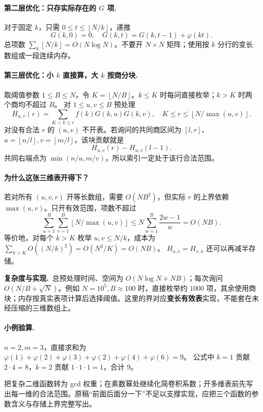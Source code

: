 \documentclass[UTF8,a4paper,11pt,oneside,openany,fontset=fandol]{ctexbook}
\theoremstyle{definition}
\newcommand{\floor}[1]{\left\lfloor #1\right\rfloor}
\newcommand{\cost}{\par\noindent\textbf{复杂度与实现.}\ }
\begin{document}
\paragraph{第二层优化：只存实际存在的 $G$ 项.}
对于固定 $k$，只需 $0\le t\le\floor{N/k}$，递推
\[
 G(k,0)=0,\quad G(k,t)=G(k,t-1)+\varphi(kt).
\]
总项数 $\sum_k\floor{N/k}=O(N\log N)$。不要开 $N\times N$ 矩阵；使用按 $k$ 分行的变长数组或一段连续内存。

\paragraph{第三层优化：小 $k$ 直接算，大 $k$ 按商分块.}
取阈值参数 $1\le B\le N$，令 $K=\floor{N/B}$。$k\le K$ 时每问直接枚举；$k>K$ 时两个商均不超过 $B$。
对 $1\le u,v\le B$ 预处理
\[
 H_{u,v}(r)=\sum_{K<k\le r}f(k)G(k,u)G(k,v),
 \quad K\le r\le\floor{N/\max(u,v)}.
\]
对没有合法 $r$ 的 $(u,v)$ 不开表。若询问的共同商区间为 $[l,r]$、$u=\floor{n/l},v=\floor{m/l}$，该块贡献就是
\[
 H_{u,v}(r)-H_{u,v}(l-1).
\]
共同右端点为 $\min(n/u,m/v)$，所以索引一定处于该行合法范围。

\paragraph{为什么这张三维表开得下？}
若对所有 $(u,v,r)$ 开等长数组，需要 $O(NB^2)$，但实际 $r$ 的上界依赖 $\max(u,v)$。只开有效范围，项数不超过
\[
\sum_{u=1}^B\sum_{v=1}^B\floor{N/\max(u,v)}
\le N\sum_{w=1}^B\frac{2w-1}{w}=O(NB).
\]
等价地，对每个 $k>K$ 枚举 $u,v\le N/k$，成本为
$\sum_{k>K}O((N/k)^2)=O(N^2/K)=O(NB)$。
$H_{u,v}=H_{v,u}$ 还可以再减半存储。

\cost 总预处理时间、空间为 $O(N\log N+NB)$；每次询问 $O(N/B+\sqrt N)$。例如 $N=10^5,B\approx100$ 时，直接枚举约 $1000$ 项，其余使用商块；内存按真实表项计算后选择阈值。这里的界对应\textbf{变长有效表}实现，不能套在未经压缩的三维数组上。

\paragraph{小例验算.} $n=2,m=3$，直接求和为
$\varphi(1)+\varphi(2)+\varphi(3)+\varphi(2)+\varphi(4)+\varphi(6)=9$。
公式中 $k=1$ 贡献 $2\cdot4=8$，$k=2$ 贡献 $1\cdot1\cdot1=1$，合计 $9$。
\begin{teach}[这道题的三个教学收获]
把复杂二维函数转为 gcd 权重；在素数幂处继续化简卷积系数；开多维表前先写出每一维的合法范围。原稿“前面后面分一下”不足以支撑实现，应把三个函数的参数含义与存储上界完整写出。
\end{teach}
\end{document}
